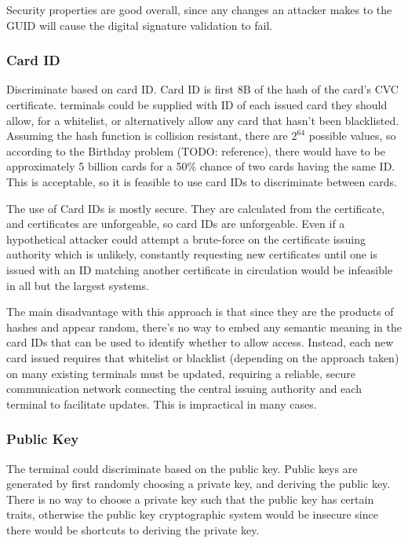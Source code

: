 \documentclass[12pt]{article}
\begin{document}
Security properties are good overall, since any changes an attacker makes to the GUID will cause the digital signature validation to fail.


\subsubsection{Card ID}
Discriminate based on card ID. Card ID is first 8B of the hash of the card's CVC certificate. terminals could be supplied with ID of each issued card they should allow, for a whitelist, or alternatively allow any card that hasn't been blacklisted. Assuming the hash function is collision resistant, there are $2^{64}$ possible values, so according to the Birthday problem (TODO: reference), there would have to be approximately 5 billion cards for a 50\% chance of two cards having the same ID. This is acceptable, so it is feasible to use card IDs to discriminate between cards.

The use of Card IDs is mostly secure. They are calculated from the certificate, and certificates are unforgeable, so card IDs are unforgeable. Even if a hypothetical attacker could attempt a brute-force on the certificate issuing authority which is unlikely, constantly requesting new certificates until one is issued with an ID matching another certificate in circulation would be infeasible in all but the largest systems. %

The main disadvantage with this approach is that since they are the products of hashes and appear random, there's no way to embed any semantic meaning in the card IDs that can be used to identify whether to allow access. Instead, each new card issued requires that whitelist or blacklist (depending on the approach taken) on many existing terminals must be updated, requiring a reliable, secure communication network connecting the central issuing authority and each terminal to facilitate updates. This is impractical in many cases.


\subsubsection{Public Key}
The terminal could discriminate based on the public key. Public keys are generated by first randomly choosing a private key, and deriving the public key. There is no way to choose a private key such that the public key has certain traits, otherwise the public key cryptographic system would be insecure since there would be shortcuts to deriving the private key. 
\end{document}
